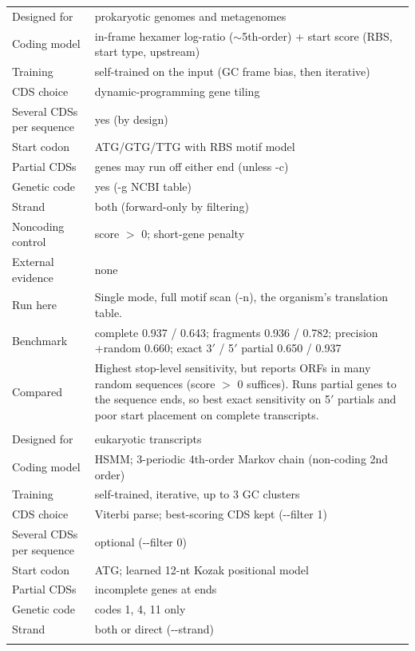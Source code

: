\begin{longtable}{@{}>{\raggedright}p{3.2cm}>{\raggedright\arraybackslash}p{12.3cm}@{}}
Designed for & prokaryotic genomes and metagenomes \\*
Coding model & in-frame hexamer log-ratio ($\sim$5th-order) + start score (RBS, start type, upstream) \\*
Training & self-trained on the input (GC frame bias, then iterative) \\*
CDS choice & dynamic-programming gene tiling \\*
Several CDSs per sequence & yes (by design) \\*
Start codon & ATG/GTG/TTG with RBS motif model \\*
Partial CDSs & genes may run off either end (unless -c) \\*
Genetic code & yes (-g NCBI table) \\*
Strand & both (forward-only by filtering) \\*
Noncoding control & score $>$ 0; short-gene penalty \\*
External evidence & none \\*
Run here & Single mode, full motif scan (-n), the organism's translation table. \\*
Benchmark & complete 0.937 / 0.643; fragments 0.936 / 0.782; precision +random 0.660; exact 3$'$ / 5$'$ partial 0.650 / 0.937 \\*
Compared & Highest stop-level sensitivity, but reports ORFs in many random sequences (score $>$ 0 suffices). Runs partial genes to the sequence ends, so best exact sensitivity on 5$'$ partials and poor start placement on complete transcripts. \\
\addlinespace[6pt]
\multicolumn{2}{@{}l}{\textbf{GeneMarkS-T} \citep{Tang2015} (gmst.pl 5.1)} \\*
Designed for & eukaryotic transcripts \\*
Coding model & HSMM; 3-periodic 4th-order Markov chain (non-coding 2nd order) \\*
Training & self-trained, iterative, up to 3 GC clusters \\*
CDS choice & Viterbi parse; best-scoring CDS kept (-{}-filter 1) \\*
Several CDSs per sequence & optional (-{}-filter 0) \\*
Start codon & ATG; learned 12-nt Kozak positional model \\*
Partial CDSs & incomplete genes at ends \\*
Genetic code & codes 1, 4, 11 only \\*
Strand & both or direct (-{}-strand) \\*

\end{longtable}
